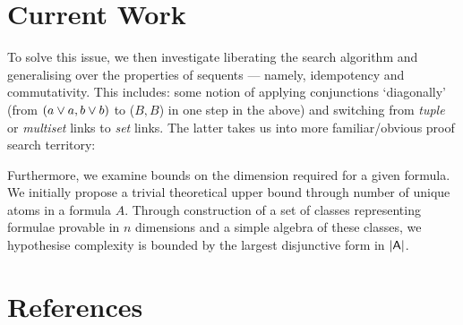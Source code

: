 \documentclass{article}
\begin{document}
    \section*{Current Work}
        To solve this issue, we then investigate liberating the search algorithm and generalising over the properties of sequents --- namely, idempotency and commutativity.
        This includes: some notion of applying conjunctions `diagonally' (from $(a \vee  a, b \vee  b)$ to ($B, B$) in one step in the above) and switching from \emph{tuple} or \emph{multiset} links to \emph{set} links.
        The latter takes us into more familiar/obvious proof search territory:
        \begin{figure}[H]
            \def\x{1cm}
            \def\y{1cm}
            \centering
        \end{figure}

        Furthermore, we examine bounds on the dimension required for a given formula.
        We initially propose a trivial theoretical upper bound through number of unique atoms in a formula $A$.
        Through construction of a set of classes representing formulae provable in $n$ dimensions and a simple algebra of these classes, we hypothesise complexity is bounded by the largest disjunctive form in $\mathsf{|A|}$.



    \section*{References}
        
\end{document}
